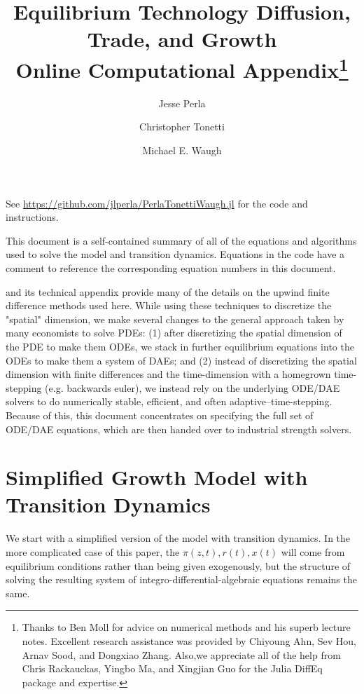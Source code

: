 \documentclass[11pt]{article}
\begin{document}
\title{Equilibrium Technology Diffusion, Trade, and Growth\\Online Computational Appendix\thanks{Thanks to Ben Moll for advice on numerical methods and his superb lecture notes.  Excellent research assistance was provided by Chiyoung Ahn, Sev Hou, Arnav Sood, and Dongxiao Zhang.  Also,we appreciate all of the help from Chris Rackauckas, Yingbo Ma, and Xingjian Guo for the Julia DiffEq package and expertise.}}
\author{Jesse Perla \and Christopher Tonetti \and Michael E. Waugh}
\maketitle

\noindent See \url{https://github.com/jlperla/PerlaTonettiWaugh.jl} for the code and instructions.
\bigskip

This document is a self-contained summary of all of the equations and algorithms used to solve the model and transition dynamics.  Equations in the code have a comment to reference the corresponding equation numbers in this document.

\cite{AchdouHanLasryEtAl2017} and its technical appendix provide many of the details on the upwind finite difference methods used here.  While using these techniques to discretize the "spatial" dimension, we make several changes to the general approach taken by many economists to solve PDEs: (1) after discretizing the spatial dimension of the PDE to make them ODEs, we stack in further equilibrium equations into the ODEs to make them a system of DAEs; and (2) instead of discretizing the spatial dimension with finite differences and the time-dimension with a homegrown time-stepping (e.g. backwards euler), we instead rely on the underlying ODE/DAE solvers to do numerically stable, efficient, and often adaptive--time-stepping.  Because of this, this document concentrates on specifying the full set of ODE/DAE equations, which are then handed over to industrial strength solvers.

\section{Simplified Growth Model with Transition Dynamics}
We start with a simplified version of the model with transition dynamics.  In the more complicated case of this paper, the $\pi(z,t), r(t), x(t)$ will come from equilibrium conditions rather than being given exogenously, but the structure of solving the resulting system of integro-differential-algebraic equations remains the same.
\end{document}
